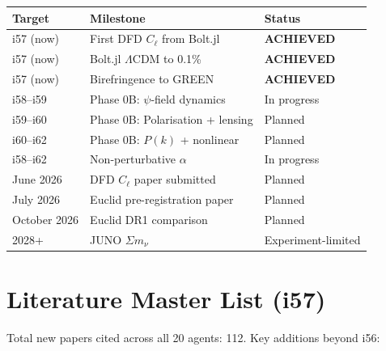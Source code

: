 \documentclass[11pt,a4paper]{article}
\begin{document}
\begin{center}
\begin{longtable}{lll}
\toprule
\textbf{Target} & \textbf{Milestone} & \textbf{Status} \\
\midrule
i57 (now) & First DFD $C_\ell$ from Bolt.jl & \textbf{ACHIEVED} \\
i57 (now) & Bolt.jl $\Lambda$CDM to 0.1\% & \textbf{ACHIEVED} \\
i57 (now) & Birefringence to GREEN & \textbf{ACHIEVED} \\
i58--i59 & Phase 0B: $\psi$-field dynamics & In progress \\
i59--i60 & Phase 0B: Polarisation + lensing & Planned \\
i60--i62 & Phase 0B: $P(k)$ + nonlinear & Planned \\
i58--i62 & Non-perturbative $\alpha$ & In progress \\
June 2026 & DFD $C_\ell$ paper submitted & Planned \\
July 2026 & Euclid pre-registration paper & Planned \\
October 2026 & Euclid DR1 comparison & Planned \\
2028+ & JUNO $\Sigma m_\nu$ & Experiment-limited \\
\bottomrule
\end{longtable}
\end{center}


\section{Literature Master List (i57)}
\label{sec:literature}

Total new papers cited across all 20 agents: 112. Key additions beyond i56:
\end{document}
